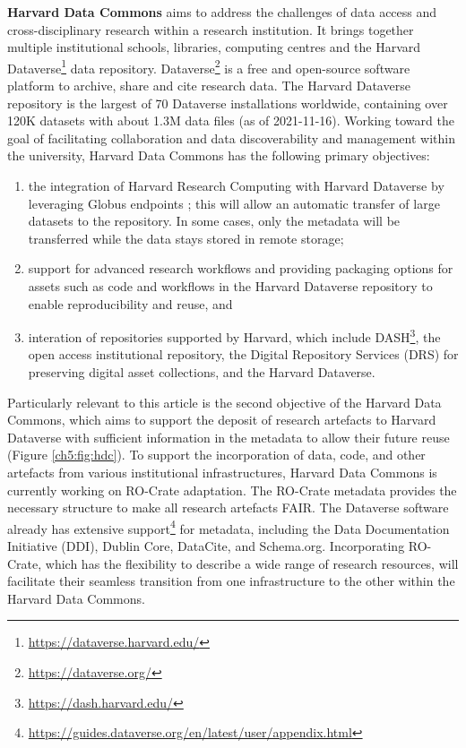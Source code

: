 \textbf{Harvard Data Commons}
\cite{Crosas 2020} aims to address the
challenges of data access and cross-disciplinary research within a
research institution. It brings together multiple institutional schools,
libraries, computing centres and the
Harvard
Dataverse\footnote{\url{https://dataverse.harvard.edu/}} data repository.
Dataverse\footnote{\url{https://dataverse.org/}}
\cite{Crosas 2011} is a free
and open-source software platform to archive, share and cite research
data. The Harvard Dataverse repository is the largest of 70 Dataverse
installations worldwide, containing over 120K datasets with about 1.3M
data files (as of 2021-11-16). Working toward the goal of facilitating
collaboration and data discoverability and management within the
university, Harvard Data Commons has the following primary objectives:

\begin{enumerate}
\item
  the integration of Harvard Research Computing with Harvard Dataverse
  by leveraging Globus endpoints
  \cite{Chard 2014}; this will allow
  an automatic transfer of large datasets to the repository. In some
  cases, only the metadata will be transferred while the data stays
  stored in remote storage;
\item
  support for advanced research workflows and providing packaging
  options for assets such as code and workflows in the Harvard Dataverse
  repository to enable reproducibility and reuse, and
\item
  interation of repositories supported by Harvard, which include
  DASH\footnote{\url{https://dash.harvard.edu/}}, the open access institutional
  repository, the Digital Repository Services (DRS) for preserving
  digital asset collections, and the Harvard Dataverse.
\end{enumerate}

Particularly relevant to this article is the second objective of the
Harvard Data Commons, which aims to support the deposit of research
artefacts to Harvard Dataverse with sufficient information in the
metadata to allow their future reuse (Figure \vref{ch5:fig:hdc}). To support the incorporation of data, code, and other artefacts
from various institutional infrastructures, Harvard Data Commons is
currently working on RO-Crate adaptation. The RO-Crate metadata provides
the necessary structure to make all research artefacts FAIR. The
Dataverse software already has
extensive
support\footnote{\url{https://guides.dataverse.org/en/latest/user/appendix.html}} for metadata, including the Data Documentation Initiative
(DDI), Dublin Core, DataCite, and Schema.org. Incorporating RO-Crate,
which has the flexibility to describe a wide range of research
resources, will facilitate their seamless transition from one
infrastructure to the other within the Harvard Data Commons.

